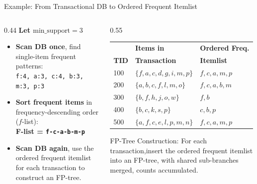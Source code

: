 \documentclass[aspectratio=169, 11pt]{beamer}
\begin{document}
\begin{frame}{Example: From Transactional DB to Ordered Frequent Itemlist}

    \begin{columns}[T]
        \begin{column}{0.44\textwidth}
            \textbf{Let $\text{min\_support} = 3$}
            \vspace{0.2cm}
            \begin{itemize}
                \item \textbf{Scan DB once}, find single-item frequent patterns: \\
                \texttt{f:4, a:3, c:4, b:3, m:3, p:3}
                \vspace{0.15cm}
                \item \textbf{Sort frequent items} in frequency-descending order ($f$-list): \\
                \textbf{F-list = \texttt{f-c-a-b-m-p}}
                \vspace{0.15cm}
                \item \textbf{Scan DB again}, use the ordered frequent itemlist for each transaction to construct an FP-tree.
            \end{itemize}
        \end{column}

        \begin{column}{0.55\textwidth}
            \small
            \begin{tabular}{@{}lll@{}}
                \toprule
                             & \textbf{Items in}    & \textbf{Ordered Freq.} \\
                \textbf{TID} & \textbf{Transaction} & \textbf{Itemlist} \\
                \midrule
                100 & $\{f, a, c, d, g, i, m, p\}$ & $f, c, a, m, p$ \\
                200 & $\{a, b, c, f, l, m, o\}$    & $f, c, a, b, m$ \\
                300 & $\{b, f, h, j, o, w\}$       & $f, b$ \\
                400 & $\{b, c, k, s, p\}$          & $c, b, p$ \\
                500 & $\{a, f, c, e, l, p, m, n\}$ & $f, c, a, m, p$ \\
                \bottomrule
            \end{tabular}
            \vspace{4mm}
            \begin{block}{FP-Tree Construction:}
                For each transaction,insert the ordered frequent itemlist into an FP-tree,  with shared sub-branches merged, counts accumulated.
            \end{block}
        \end{column}
    \end{columns}
\end{frame}
\end{document}
